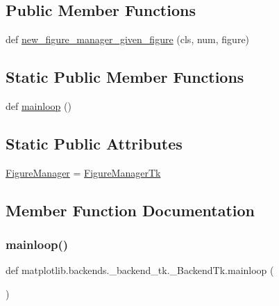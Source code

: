 \subsection*{Public Member Functions}
\begin{DoxyCompactItemize}
\item 
def \hyperlink{classmatplotlib_1_1backends_1_1__backend__tk_1_1__BackendTk_a608b9b9ea65d84d0679dfb3302684d7a}{new\+\_\+figure\+\_\+manager\+\_\+given\+\_\+figure} (cls, num, figure)
\end{DoxyCompactItemize}
\subsection*{Static Public Member Functions}
\begin{DoxyCompactItemize}
\item 
def \hyperlink{classmatplotlib_1_1backends_1_1__backend__tk_1_1__BackendTk_afe90addb0c4a3382d8cee7cf7b8039ef}{mainloop} ()
\end{DoxyCompactItemize}
\subsection*{Static Public Attributes}
\begin{DoxyCompactItemize}
\item 
\hyperlink{classmatplotlib_1_1backends_1_1__backend__tk_1_1__BackendTk_a01e9f9b07d35950c9bc364d75091197a}{Figure\+Manager} = \hyperlink{classmatplotlib_1_1backends_1_1__backend__tk_1_1FigureManagerTk}{Figure\+Manager\+Tk}
\end{DoxyCompactItemize}


\subsection{Member Function Documentation}
\mbox{\label{classmatplotlib_1_1backends_1_1__backend__tk_1_1__BackendTk_afe90addb0c4a3382d8cee7cf7b8039ef}} 
\subsubsection{\texorpdfstring{mainloop()}{mainloop()}}
{\footnotesize\ttfamily def matplotlib.\+backends.\+\_\+backend\+\_\+tk.\+\_\+\+Backend\+Tk.\+mainloop (\begin{DoxyParamCaption}{ }\end{DoxyParamCaption})\hspace{0.3cm}{\ttfamily [static]}}

